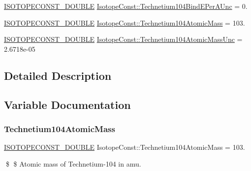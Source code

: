 \begin{DoxyCompactItemize}
\item 
\mbox{\hyperlink{group___isotope_const-_macros_ga8f45a7272ce02c0b4c65c44636ed719a}{I\+S\+O\+T\+O\+P\+E\+C\+O\+N\+S\+T\+\_\+\+D\+O\+U\+B\+LE}} \mbox{\hyperlink{group___isotope_const-_technetium-_tc104_ga5591d54a914183044aea8cb5b77d89a7}{Isotope\+Const\+::\+Technetium104\+Bind\+E\+Per\+A\+Unc}} = 0.
\item 
\mbox{\hyperlink{group___isotope_const-_macros_ga8f45a7272ce02c0b4c65c44636ed719a}{I\+S\+O\+T\+O\+P\+E\+C\+O\+N\+S\+T\+\_\+\+D\+O\+U\+B\+LE}} \mbox{\hyperlink{group___isotope_const-_technetium-_tc104_ga5739da9c2fde5b447c3c9b17c58c2ee0}{Isotope\+Const\+::\+Technetium104\+Atomic\+Mass}} = 103.
\item 
\mbox{\hyperlink{group___isotope_const-_macros_ga8f45a7272ce02c0b4c65c44636ed719a}{I\+S\+O\+T\+O\+P\+E\+C\+O\+N\+S\+T\+\_\+\+D\+O\+U\+B\+LE}} \mbox{\hyperlink{group___isotope_const-_technetium-_tc104_ga63fdfa63ec5db9f0eb1a34e44cd15972}{Isotope\+Const\+::\+Technetium104\+Atomic\+Mass\+Unc}} = 2.\+6718e-\/05
\end{DoxyCompactItemize}


\subsection{Detailed Description}


\subsection{Variable Documentation}
\mbox{\label{group___isotope_const-_technetium-_tc104_ga5739da9c2fde5b447c3c9b17c58c2ee0}} 
\subsubsection{\texorpdfstring{Technetium104\+Atomic\+Mass}{Technetium104AtomicMass}}
{\footnotesize\ttfamily \mbox{\hyperlink{group___isotope_const-_macros_ga8f45a7272ce02c0b4c65c44636ed719a}{I\+S\+O\+T\+O\+P\+E\+C\+O\+N\+S\+T\+\_\+\+D\+O\+U\+B\+LE}} Isotope\+Const\+::\+Technetium104\+Atomic\+Mass = 103.}

\$ \$ Atomic mass of Technetium-\/104 in amu. \mbox{\label{group___isotope_const-_technetium-_tc104_ga63fdfa63ec5db9f0eb1a34e44cd15972}} 
